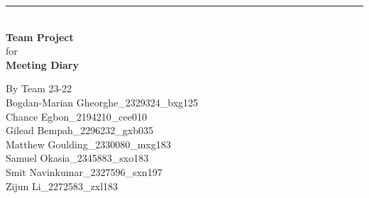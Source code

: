 \documentclass[a4paper]{article}
\begin{document}

\begin{titlepage}
	
	\rule{\linewidth}{5pt}
	\raggedleft
	\fontsize{38pt}{50pt}\selectfont
    \textbf{\\Team Project\\}
    \fontsize{28pt}{60pt}\selectfont 
    for\\
    \fontsize{38pt}{60pt}\selectfont 
    \textbf{Meeting Diary\\}
	
	\vfill %
	
	
	\parbox[t]{0.93\textwidth}{ %
		\raggedleft %
		\large %
		{\Large By Team 23-22}\\[4pt] %
		Bogdan-Marian Gheorghe\_2329324\_bxg125\\
		Chance Egbon\_2194210\_cee010\\
		Gilead Bempah\_2296232\_gxb035\\
		Matthew Goulding\_2330080\_mxg183\\
		Samuel Okasia\_2345883\_sxo183\\
		Smit Navinkumar\_2327596\_sxn197\\
		Zijun Li\_2272583\_zxl183\\
	}
	
\end{titlepage}
\end{document}
